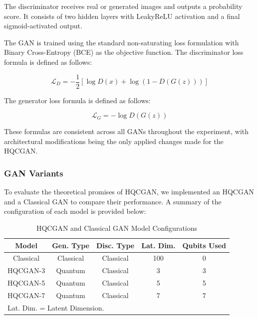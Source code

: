 \documentclass[conference]{IEEEtran}
\begin{document}
The discriminator receives real or generated images and outputs a probability score. It consists of two hidden layers with LeakyReLU activation and a final sigmoid-activated output.

The GAN is trained using the standard non-saturating loss formulation with Binary Cross-Entropy (BCE) as the objective function. The discriminator loss formula is defined as follows:

\begin{equation}
\mathcal{L}_D = -\frac{1}{2} \left[\log D(x) + \log \left(1 - D(G(z))\right)\right]
\end{equation}

The generator loss formula is defined as follows:

\begin{equation}
\mathcal{L}_G = -\log D(G(z))
\end{equation}

These formulas are consistent across all GANs throughout the experiment, with architectural modifications being the only applied changes made for the HQCGAN.

\subsubsection{GAN Variants}
To evaluate the theoretical promises of HQCGAN, we implemented an HQCGAN and a Classical GAN to compare their performance. A summary of the configuration of each model is provided below:

\begin{table}[htbp]
\caption{HQCGAN and Classical GAN Model Configurations}
\begin{center}
\begin{tabular}{|c|c|c|c|c|}
\hline
\textbf{Model} & \textbf{Gen. Type} & \textbf{Disc. Type} & \textbf{Lat. Dim.} & \textbf{Qubits Used} \\
\hline
Classical  & Classical & Classical & 100 & 0 \\
HQCGAN-3   & Quantum   & Classical & 3   & 3 \\
HQCGAN-5   & Quantum   & Classical & 5   & 5 \\
HQCGAN-7   & Quantum   & Classical & 7   & 7 \\
\hline
\multicolumn{5}{l}{\footnotesize{Lat. Dim. = Latent Dimension.}}
\end{tabular}
\label{tab:HQCGAN_configs}
\end{center}
\end{table}
\end{document}
